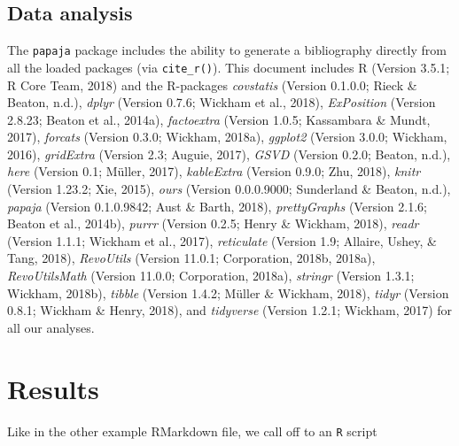 \documentclass[man,floatsintext]{apa6}
\theoremstyle{definition}
\theoremstyle{definition}
\theoremstyle{definition}
\theoremstyle{remark}
\begin{document}
\hypertarget{data-analysis}{%
\subsection{Data analysis}\label{data-analysis}}

The \texttt{papaja} package includes the ability to generate a
bibliography directly from all the loaded packages (via
\texttt{cite\_r()}). This document includes R (Version 3.5.1; R Core
Team, 2018) and the R-packages \emph{covstatis} (Version 0.1.0.0; Rieck
\& Beaton, n.d.), \emph{dplyr} (Version 0.7.6; Wickham et al., 2018),
\emph{ExPosition} (Version 2.8.23; Beaton et al., 2014a),
\emph{factoextra} (Version 1.0.5; Kassambara \& Mundt, 2017),
\emph{forcats} (Version 0.3.0; Wickham, 2018a), \emph{ggplot2} (Version
3.0.0; Wickham, 2016), \emph{gridExtra} (Version 2.3; Auguie, 2017),
\emph{GSVD} (Version 0.2.0; Beaton, n.d.), \emph{here} (Version 0.1;
Müller, 2017), \emph{kableExtra} (Version 0.9.0; Zhu, 2018),
\emph{knitr} (Version 1.23.2; Xie, 2015), \emph{ours} (Version
0.0.0.9000; Sunderland \& Beaton, n.d.), \emph{papaja} (Version
0.1.0.9842; Aust \& Barth, 2018), \emph{prettyGraphs} (Version 2.1.6;
Beaton et al., 2014b), \emph{purrr} (Version 0.2.5; Henry \& Wickham,
2018), \emph{readr} (Version 1.1.1; Wickham et al., 2017),
\emph{reticulate} (Version 1.9; Allaire, Ushey, \& Tang, 2018),
\emph{RevoUtils} (Version 11.0.1; Corporation, 2018b, 2018a),
\emph{RevoUtilsMath} (Version 11.0.0; Corporation, 2018a),
\emph{stringr} (Version 1.3.1; Wickham, 2018b), \emph{tibble} (Version
1.4.2; Müller \& Wickham, 2018), \emph{tidyr} (Version 0.8.1; Wickham \&
Henry, 2018), and \emph{tidyverse} (Version 1.2.1; Wickham, 2017) for
all our analyses.

\hypertarget{results}{%
\section{Results}\label{results}}

Like in the other example RMarkdown file, we call off to an \texttt{R}
script
\end{document}
